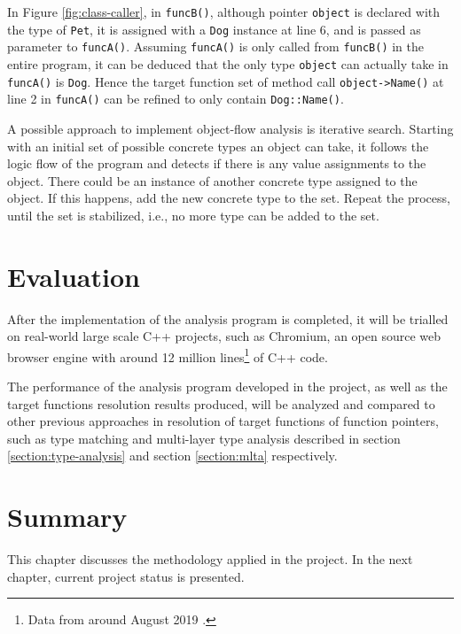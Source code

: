 In Figure \ref{fig:class-caller}, in \texttt{funcB()}, although pointer \texttt{object} is declared with the type of \texttt{Pet}, it is assigned with a \texttt{Dog} instance at line 6, and is passed as parameter to \texttt{funcA()}. Assuming \texttt{funcA()} is only called from \texttt{funcB()} in the entire program, it can be deduced that the only type \texttt{object} can actually take in \texttt{funcA()} is \texttt{Dog}. Hence the target function set of method call \texttt{object->Name()} at line 2 in \texttt{funcA()} can be refined to only contain \texttt{Dog::Name()}.

A possible approach to implement object-flow analysis is iterative search. Starting with an initial set of possible concrete types an object can take, it follows the logic flow of the program and detects if there is any value assignments to the object. There could be an instance of another concrete type assigned to the object. If this happens, add the new concrete type to the set. Repeat the process, until the set is stabilized, i.e., no more type can be added to the set.

\section{Evaluation}
\label{section:evaluation}

After the implementation of the analysis program is completed, it will be trialled on real-world large scale C++ projects, such as Chromium, an open source web browser engine with around 12 million lines\footnote{Data from around August 2019 \cite{chromium-loc}.} of C++ code.

The performance of the analysis program developed in the project, as well as the target functions resolution results produced, will be analyzed and compared to other previous approaches in resolution of target functions of function pointers, such as type matching and multi-layer type analysis described in section \ref{section:type-analysis} and section \ref{section:mlta} respectively.

\section{Summary}
\label{section:methodology-summary}

This chapter discusses the methodology applied in the project. In the next chapter, current project status is presented.